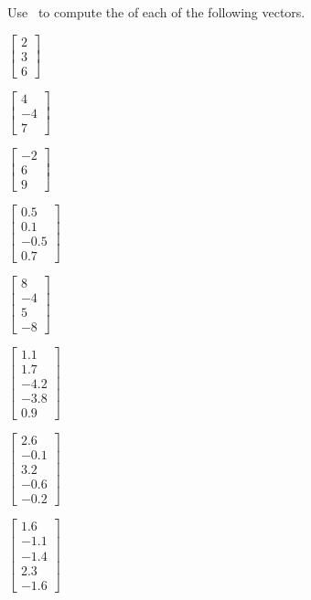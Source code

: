 \begin{exercise}  
Use \script\ to compute the  of each of the following vectors.
\begin{Parts}[4]
\item \(\begin{bmatrix} 2\\3\\6 \end{bmatrix}\)
\item \(\begin{bmatrix} 4\\-4\\7 \end{bmatrix}\)
\begin{reduce}
\item \(\begin{bmatrix} -2\\6\\9 \end{bmatrix}\)
\item \(\begin{bmatrix} 0.5\\0.1\\-0.5\\0.7 \end{bmatrix}\)
\item \(\begin{bmatrix} 8\\-4\\5\\-8 \end{bmatrix}\)
\item \(\begin{bmatrix} 1.1\\1.7\\-4.2\\-3.8\\0.9 \end{bmatrix}\)
\end{reduce}
\item \(\begin{bmatrix} 2.6\\-0.1\\3.2\\-0.6\\-0.2 \end{bmatrix}\)
\item \(\begin{bmatrix} 1.6\\-1.1\\-1.4\\2.3\\-1.6 \end{bmatrix}\)
\end{Parts}
\end{exercise}




